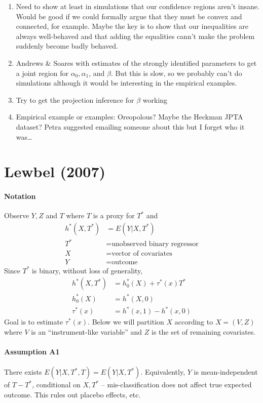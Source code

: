 \documentclass[12pt]{article}
\begin{document}
\begin{enumerate}
  \item Need to show at least in simulations that our confidence regions aren't insane. Would be good if we could formally argue that they must be convex and connected, for example.
    Maybe the key is to show that our inequalities are always well-behaved and that adding the equalities cann't make the problem suddenly become badly behaved.
  \item Andrews \& Soares with estimates of the strongly identified parameters to get a joint region for $\alpha_0, \alpha_1$, and $\beta$. But this is slow, so we probably can't do simulations although it would be interesting in the empirical examples.
  \item Try to get the projection inference for $\beta$ working 
  \item Empirical example or examples: Oreopolous? Maybe the Heckman JPTA dataset? Petra suggested emailing someone about this but I forget who it was\ldots

\end{enumerate}

\section{Lewbel (2007)}

\paragraph{Notation}
Observe $Y,Z$ and $T$ where $T$ is a proxy for $T^*$ and
\begin{align*}
  h^*(X,T^*) &= E(Y|X,T^*)\\
  T^* &= \mbox{unobserved binary regressor}\\
  X &= \mbox{vector of covariates}\\
  Y &= \mbox{outcome}
\end{align*}
Since $T^*$ is binary, without loss of generality,
\begin{align*}
  h^*(X,T^*) &= h_0^*(X) + \tau^*(x)T^*\\
  h^*_0(X) &= h^*(X,0)\\
  \tau^*(x) &= h^*(x,1) - h^*(x,0)
\end{align*}
Goal is to estimate $\tau^*(x)$.
Below we will partition $X$ according to $X = (V,Z)$ where $V$ is an ``instrument-like variable'' and $Z$ is the set of remaining covariates.

\paragraph{Assumption A1} 
There exists $E(Y|X,T^*,T) = E(Y|X,T^*)$.
Equivalently, $Y$ is mean-independent of $T-T^*$, conditional on $X,T^*$ -- mis-classification does not affect true expected outcome.
This rules out placebo effects, etc.
\end{document}
